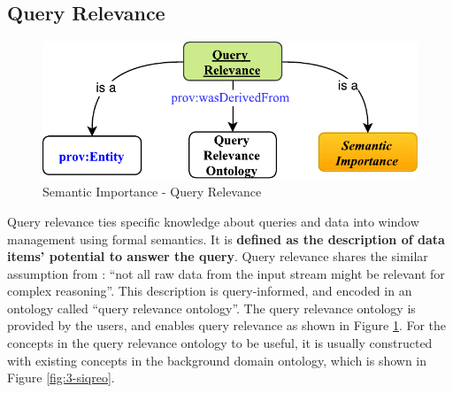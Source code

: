 \subsection{Query Relevance}

\begin{figure}[!htbp]
	\centering
    \includegraphics[width=5in]{img/3-siqr.pdf}
    \caption{Semantic Importance - Query Relevance}
    \label{fig:3-siqr}
\end{figure}
Query relevance ties specific knowledge about queries and data into window management using formal semantics. 
It is \textbf{defined as the description of data items' potential to answer the query}.
Query relevance shares the similar assumption from \cite{mileo2013streamrule}: 
``not all raw data from the input stream might be relevant for complex reasoning''.
This description is query-informed, and encoded in an ontology called ``query relevance ontology''.
The query relevance ontology is provided by the users, and enables query relevance as shown in Figure \ref{fig:3-siqr}.
For the concepts in the query relevance ontology to be useful, it is usually constructed with existing concepts in the background domain ontology, which is shown in Figure \ref{fig:3-siqreo}.

